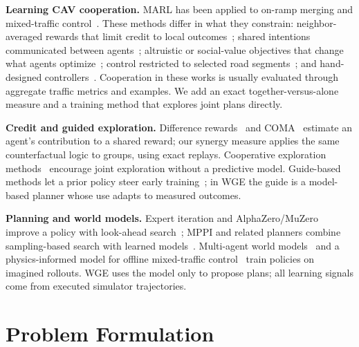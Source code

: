 \documentclass[conference]{IEEEtran}
\begin{document}
\textbf{Learning CAV cooperation.} MARL has been applied to on-ramp merging and mixed-traffic control~\cite{chen_merge2021,guo_mappopis2024,wu_flow2022}. These methods differ in what they constrain: neighbor-averaged rewards that limit credit to local outcomes~\cite{chen_merge2021}; shared intentions communicated between agents~\cite{guo_mappopis2024}; altruistic or social-value objectives that change what agents optimize~\cite{toghi_social2022,schwarting_svo2019}; control restricted to selected road segments~\cite{vinitsky_lagrangian2018}; and hand-designed controllers~\cite{lee_circles2024}. Cooperation in these works is usually evaluated through aggregate traffic metrics and examples. We add an exact together-versus-alone measure and a training method that explores joint plans directly.

\textbf{Credit and guided exploration.} Difference rewards~\cite{wolpert_tumer2002,castellini_drreinforce} and COMA~\cite{foerster_coma2018} estimate an agent's contribution to a shared reward; our synergy measure applies the same counterfactual logic to groups, using exact replays. Cooperative exploration methods~\cite{liu_cmae2021} encourage joint exploration without a predictive model. Guide-based methods let a prior policy steer early training~\cite{uchendu_jsrl2023,torrey_advising2013}; in WGE the guide is a model-based planner whose use adapts to measured outcomes.

\textbf{Planning and world models.} Expert iteration and AlphaZero/MuZero improve a policy with look-ahead search~\cite{anthony_exit2017,silver_alphazero2018,schrittwieser_muzero2020}; MPPI and related planners combine sampling-based search with learned models~\cite{williams_mppi2017,hansen_tdmpc2_2024,levine_gps2013}. Multi-agent world models~\cite{egorov_mamba2022,zhang_marie2024} and a physics-informed model for offline mixed-traffic control~\cite{liu_physics_wm2026} train policies on imagined rollouts. WGE uses the model only to propose plans; all learning signals come from executed simulator trajectories.

\section{Problem Formulation}
\end{document}
